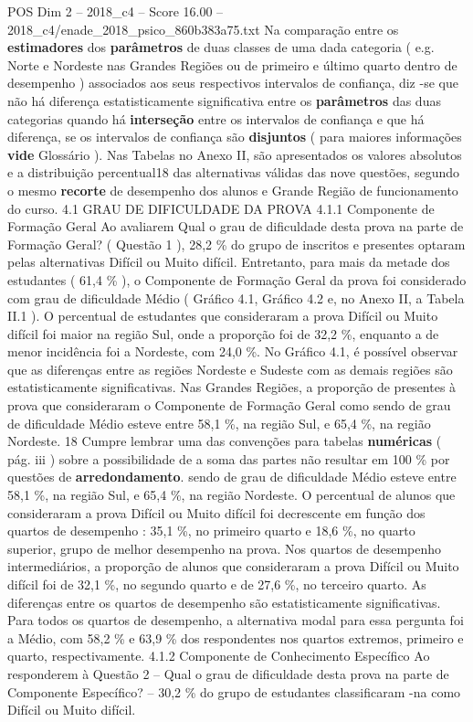 \begin{textsample}{POS Dim 2 – 2018\_c4 – Score 16.00 – 2018\_c4/enade\_2018\_psico\_860b383a75.txt}
Na comparação entre os \textbf{estimadores} dos \textbf{parâmetros} de duas classes de uma dada categoria ( e.g.
Norte e Nordeste nas Grandes Regiões ou de primeiro e último quarto dentro de desempenho ) associados aos seus respectivos intervalos de confiança, diz -se que não há diferença estatisticamente significativa entre os \textbf{parâmetros} das duas categorias quando há \textbf{interseção} entre os intervalos de confiança e que há diferença, se os intervalos de confiança são \textbf{disjuntos} ( para maiores informações \textbf{vide} Glossário ).
Nas Tabelas no Anexo II, são apresentados os valores absolutos e a distribuição percentual18 das alternativas válidas das nove questões, segundo o mesmo \textbf{recorte} de desempenho dos alunos e Grande Região de funcionamento do curso. 4.1 GRAU DE DIFICULDADE DA PROVA 4.1.1 Componente de Formação Geral Ao avaliarem Qual o grau de dificuldade desta prova na parte de Formação Geral? ( Questão 1 ), 28,2 \% do grupo de inscritos e presentes optaram pelas alternativas Difícil ou Muito difícil.
Entretanto, para mais da metade dos estudantes ( 61,4 \% ), o Componente de Formação Geral da prova foi considerado com grau de dificuldade Médio ( Gráfico 4.1, Gráfico 4.2 e, no Anexo II, a Tabela II.1 ).
O percentual de estudantes que consideraram a prova Difícil ou Muito difícil foi maior na região Sul, onde a proporção foi de 32,2 \%, enquanto a de menor incidência foi a Nordeste, com 24,0 \%.
No Gráfico 4.1, é possível observar que as diferenças entre as regiões Nordeste e Sudeste com as demais regiões são estatisticamente significativas.
Nas Grandes Regiões, a proporção de presentes à prova que consideraram o Componente de Formação Geral como sendo de grau de dificuldade Médio esteve entre 58,1 \%, na região Sul, e 65,4 \%, na região Nordeste. 18 Cumpre lembrar uma das convenções para tabelas \textbf{numéricas} ( pág. iii ) sobre a possibilidade de a soma das partes não resultar em 100 \% por questões de \textbf{arredondamento}. sendo de grau de dificuldade Médio esteve entre 58,1 \%, na região Sul, e 65,4 \%, na região Nordeste.
O percentual de alunos que consideraram a prova Difícil ou Muito difícil foi decrescente em função dos quartos de desempenho : 35,1 \%, no primeiro quarto e 18,6 \%, no quarto superior, grupo de melhor desempenho na prova.
Nos quartos de desempenho intermediários, a proporção de alunos que consideraram a prova Difícil ou Muito difícil foi de 32,1 \%, no segundo quarto e de 27,6 \%, no terceiro quarto.
As diferenças entre os quartos de desempenho são estatisticamente significativas.
Para todos os quartos de desempenho, a alternativa modal para essa pergunta foi a Médio, com 58,2 \% e 63,9 \% dos respondentes nos quartos extremos, primeiro e quarto, respectivamente. 4.1.2 Componente de Conhecimento Específico Ao responderem à Questão 2 – Qual o grau de dificuldade desta prova na parte de Componente Específico? – 30,2 \% do grupo de estudantes classificaram -na como Difícil ou Muito difícil.

\end{textsample}
